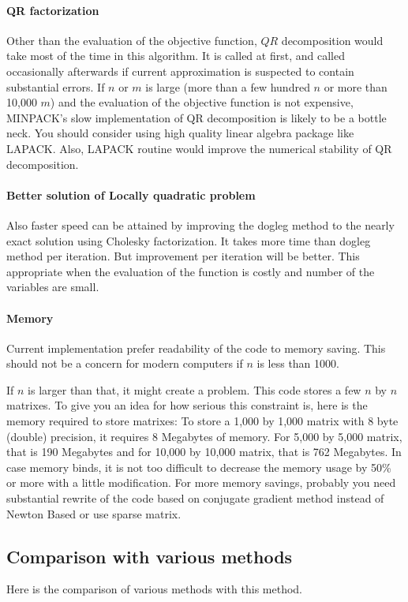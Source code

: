 \documentclass[12pt]{article}
\begin{document}
\paragraph{QR factorization} 
Other than the evaluation of the objective function, $QR$ decomposition would take most of the
time in this algorithm. It is called at first, and called occasionally afterwards if current
approximation is suspected to contain substantial errors. If $n$ or $m$ is large (more than a few
hundred $n$ or more than 10,000 $m$) and the evaluation of the objective function is not
expensive, MINPACK's slow implementation of QR decomposition is likely to be a bottle neck. You
should consider using high quality linear algebra package like LAPACK. Also, LAPACK routine would
improve the numerical stability of QR decomposition. 

\paragraph{Better solution of Locally quadratic problem}
Also faster speed can be attained by improving the dogleg method to the nearly exact solution
using Cholesky factorization. It takes more time than dogleg method per iteration. But improvement
per iteration will be better. This appropriate when the evaluation of the function is costly and
number of the variables are small.


\paragraph{Memory}
Current implementation prefer readability of the code to memory saving.  This should not be a
concern for modern computers if $n$ is less than 1000. 

If $n$ is larger than that, it might create a problem. This code stores a few $n$ by $n$
matrixes. To give you an idea for how serious this constraint is, here is the memory required to
store matrixes: To store a 1,000 by 1,000 matrix with 8 byte (double) precision, it requires 8
Megabytes of memory. For 5,000 by 5,000 matrix, that is 190 Megabytes and for 10,000 by 10,000
matrix, that is 762 Megabytes. In case memory binds, it is not too difficult to decrease the
memory usage by 50\% or more with a little modification. For more memory savings, probably you
need substantial rewrite of the code based on conjugate gradient method instead of Newton Based or
use sparse matrix.


\subsection{Comparison with various methods}
Here is the comparison of various methods with this method. 
\end{document}
